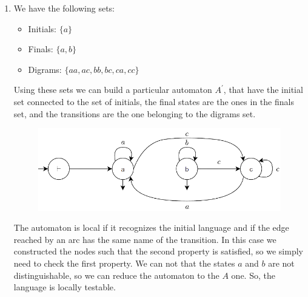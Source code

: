 \documentclass[12pt, a4paper]{report}
\begin{document}
\begin{enumerate}
        \item We have the following sets: 
            \begin{itemize}
                \item Initials: $\{a\}$
                \item Finals: $\{a,b\}$
                \item Digrams: $\{aa,ac,bb,bc,ca,cc\}$
            \end{itemize}
            Using these sets we can build a particular automaton $A^{'}$, that have the initial set connected to the set of initials, the final states are the ones in the finals set, and the transitions are the
            one belonging to the digrams set. 
            \begin{figure}[H]
                \centering
                \includegraphics[width=0.75\linewidth]{images/FSA6.png}
            \end{figure}
            The automaton is local if it recognizes the initial language and if the edge reached by an arc has the same name of the transition. In this case we constructed the nodes such that the second property is 
            satisfied, so we simply need to check the first property. We can not that the states $a$ and $b$ are not distinguishable, so we can reduce the automaton to the $A$ one. So, the language is locally testable. 
    \end{enumerate}

    \newpage
\end{document}

